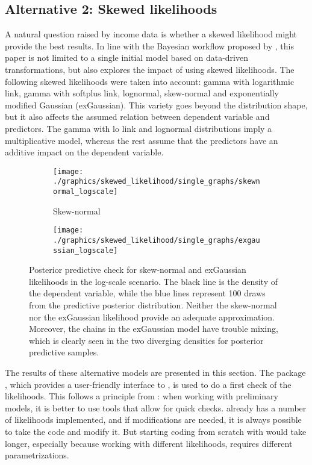 \subsection{Alternative 2: Skewed likelihoods}
\label{ch:skewed_likelihoods}
A natural question raised by income data is whether a skewed likelihood might provide the best results.
In line with the Bayesian workflow proposed by \cite{gelman_bayesian_2020}, this paper is not limited to a single initial model based on data-driven transformations, but also explores the impact of using skewed likelihoods.
The following skewed likelihoods were taken into account: gamma with logarithmic link, gamma with
softplus link, lognormal, skew-normal and exponentially modified Gaussian (exGaussian).
This variety goes beyond the distribution shape, but it also affects the assumed relation between dependent variable and predictors.
The gamma with lo link and lognormal distributions imply a multiplicative model, whereas the rest assume that the predictors have an additive impact on the dependent variable.

\begin{figure}[h]
    \centering
    \begin{subfigure}{0.45\linewidth}
        \texttt{[image: ./graphics/skewed\_likelihood/single\_graphs/skewnormal\_logscale]}
        \caption{Skew-normal}
        \label{fig:logscale_skewnormal}
    \end{subfigure}
    \begin{subfigure}{0.45\linewidth}
        \texttt{[image: ./graphics/skewed\_likelihood/single\_graphs/exgaussian\_logscale]}
        \label{fig:logscale_exgaussian}
    \end{subfigure}

    \caption[Posterior predictive check for skew-normal and exGaussian likelihoods.]{Posterior predictive check for skew-normal and exGaussian likelihoods  in the log-scale scenario. The black line is the density of the dependent variable, while the blue lines represent 100 draws from the predictive posterior distribution. Neither the skew-normal nor the exGaussian likelihood provide an adequate approximation. Moreover, the chains in the exGaussian model have trouble mixing, which is clearly seen in the two diverging densities for posterior predictive samples.}
    \label{fig:logscale_misfit}
\end{figure}

The results of these alternative models are presented in this section.
The package  \citep{burkner_brms_2017}, which provides a user-friendly interface to , is used to do a first check of the likelihoods.
This follows a principle from \cite{gelman_bayesian_2020}: when working with preliminary models, it is better to use tools that allow for quick checks.
 already has a number of likelihoods implemented, and if modifications are needed, it is always possible to take the  code and modify it.
But starting coding from scratch with  would take longer, especially because working with different likelihoods, requires different parametrizations.

